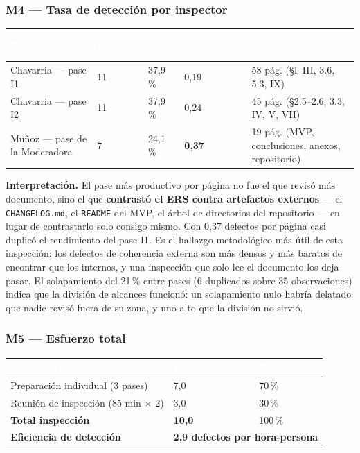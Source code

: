 \documentclass[11pt,letterpaper]{article}
\newcommand{\thead}[1]{\cellcolor{uteqverde}\textcolor{white}{\textbf{#1}}}
\begin{document}
\subsubsection*{M4 --- Tasa de detección por inspector}
\begin{center}
\small
\begin{tabular}{|p{4.6cm}|p{1.8cm}|p{1.8cm}|p{1.9cm}|p{4.4cm}|}
\hline
\thead{Pase} & \thead{Defectos} & \thead{\% total} & \thead{Def./página} & \thead{Alcance} \\ \hline
Chavarria --- pase I1 & 11 & 37,9\,\% & 0,19 & 58 pág. (\S I--III, 3.6, 5.3, IX) \\ \hline
Chavarria --- pase I2 & 11 & 37,9\,\% & 0,24 & 45 pág. (\S2.5--2.6, 3.3, IV, V, VII) \\ \hline
Muñoz --- pase de la Moderadora & 7 & 24,1\,\% & \textbf{0,37} & 19 pág. (MVP, conclusiones, anexos, repositorio) \\ \hline
\end{tabular}
\end{center}

\textbf{Interpretación.} El pase más productivo por página no fue el que revisó más documento, sino el que \textbf{contrastó el ERS contra artefactos externos} --- el \texttt{CHANGELOG.md}, el \texttt{README} del MVP, el árbol de directorios del repositorio --- en lugar de contrastarlo solo consigo mismo. Con 0,37 defectos por página casi duplicó el rendimiento del pase I1. Es el hallazgo metodológico más útil de esta inspección: los defectos de coherencia externa son más densos y más baratos de encontrar que los internos, y una inspección que solo lee el documento los deja pasar. El solapamiento del 21\,\% entre pases (6 duplicados sobre 35 observaciones) indica que la división de alcances funcionó: un solapamiento nulo habría delatado que nadie revisó fuera de su zona, y uno alto que la división no sirvió.

\subsubsection*{M5 --- Esfuerzo total}
\begin{center}
\small
\begin{tabular}{|p{6.0cm}|p{2.6cm}|p{6.0cm}|}
\hline
\thead{Actividad} & \thead{Horas-persona} & \thead{Proporción} \\ \hline
Preparación individual (3 pases) & 7,0 & 70\,\% \\ \hline
Reunión de inspección (85 min $\times$ 2) & 3,0 & 30\,\% \\ \hline
\textbf{Total inspección} & \textbf{10,0} & 100\,\% \\ \hline
\textbf{Eficiencia de detección} & \multicolumn{2}{l|}{\textbf{2,9 defectos por hora-persona}} \\ \hline
\end{tabular}
\end{center}
\end{document}
